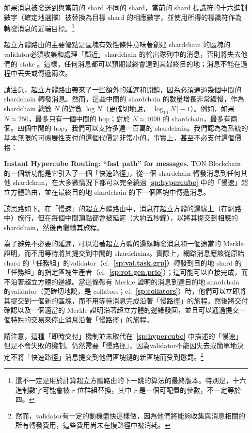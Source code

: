 \documentclass[12pt,oneside]{article}
\def\makepoint#1{\medbreak\noindent{\bf #1.\ }}
\def\nxsubpoint{\refstepcounter{subsubsection}%
  \smallbreak\makepoint{\thesubsubsection}}
\def\refpoint#1{{\rm\textbf{\ref{#1}}}}
\let\ptref=\refpoint
\def\embt(#1.){\textbf{#1.}}
\begin{document}
如果消息被發送到與當前的 shard 不同的 shard，當前的 shard 標識符的十六進制數字（確定地選擇）被替換為目標 shard 的相應數字，並使用所得的標識符作為轉發消息的近端目標。\footnote{這不一定是用於計算超立方體路由的下一跳的算法的最終版本。特別是，十六進制數字可能會被 $r$-位群組替換，其中 $r$ 是一個可配置的參數，不一定等於四。}

超立方體路由的主要優點是區塊有效性條件意味著創建 shardchain 的區塊的validator必須收集和處理「鄰近」shardchain 的輸出隊列中的消息，否則將失去他們的 stake 。這樣，任何消息都可以預期最終會達到其最終目的地；消息不能在過程中丟失或傳遞兩次。

請注意，超立方體路由帶來了一些額外的延遲和開銷，因為必須通過幾個中間的 shardchain 轉發消息。然而，這些中間的 shardchain 的數量增長非常緩慢，作為 shardchain 總數 $N$ 的對數 $\log N$（更確切地說，$\lceil\log_{16}N\rceil-1$）。例如，如果 $N\approx250$，最多只有一個中間的 hop；對於 $N\approx4000$ 的 shardchain，最多有兩個。四個中間的 hop，我們可以支持多達一百萬的 shardchain。我們認為為系統的基本無限的可擴展性支付的這個代價是非常小的。事實上，甚至不必支付這個價格：

\nxsubpoint\label{sp:instant.hypercube} \embt(Instant Hypercube
Routing: ``fast path'' for messages.) TON Blockchain 的一個新功能是它引入了一個「快速路徑」，從一個 shardchain 轉發消息到任何其他 shardchain，在大多數情況下都可以完全繞過 \ptref{sp:hypercube} 中的「慢速」超立方體路由，並在最終目的地 shardchain 的下一個區塊中傳遞消息。

該思路如下。在「慢速」的超立方體路由中，消息在超立方體的邊緣上（在網路中）旅行，但在每個中間頂點都會被延遲（大約五秒鐘），以將其提交到相應的 shardchain，然後再繼續其旅程。

為了避免不必要的延遲，可以沿著超立方體的邊緣轉發消息和一個適當的 Merkle 證明，而不用等待將其提交到中間的 shardchains。實際上，網路消息應該從原始 shard 的「任務組」的validator（cf.~\ptref{sp:val.task.grp}）轉發到目的地 shard 的「任務組」的指定區塊生產者（cf.~\ptref{sp:rot.gen.prio}）；這可能可以直接完成，而不沿著超立方體的邊緣。當這條帶有 Merkle 證明的消息到達目的地 shardchain 的validator（更確切地說，是 collators；cf.~\ptref{sp:collators}）時，他們可以立即將其提交到一個新的區塊，而不用等待消息完成沿著「慢路徑」的旅程。然後將交付確認以及一個適當的 Merkle 證明沿著超立方體的邊緣發回，並且可以通過提交一個特殊的交易來停止消息沿著「慢路徑」的旅程。

請注意，這種「即時交付」機制並未取代在~\ptref{sp:hypercube} 中描述的「慢速」但是不會失敗的機制。仍然需要「慢路徑」，因為validator不能因失去或簡單地決定不將「快速路徑」消息提交到他們區塊鏈的新區塊而受到懲罰。\footnote{然而，validator有一定的動機盡快這樣做，因為他們將能夠收集與消息相關的所有轉發費用，這些費用尚未在慢路徑中被消耗。}
\end{document}
